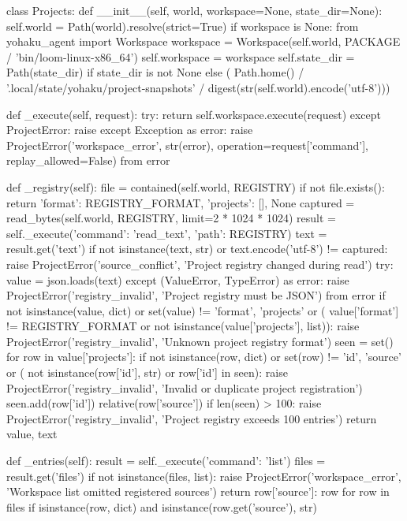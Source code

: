 class Projects:
    def __init__(self, world, workspace=None, state_dir=None):
        self.world = Path(world).resolve(strict=True)
        if workspace is None:
            from yohaku_agent import Workspace
            workspace = Workspace(self.world, PACKAGE / 'bin/loom-linux-x86_64')
        self.workspace = workspace
        self.state_dir = Path(state_dir) if state_dir is not None else (
            Path.home() / '.local/state/yohaku/project-snapshots' /
            digest(str(self.world).encode('utf-8')))

    def _execute(self, request):
        try:
            return self.workspace.execute(request)
        except ProjectError:
            raise
        except Exception as error:
            raise ProjectError('workspace_error', str(error), operation=request['command'],
                               replay_allowed=False) from error

    def _registry(self):
        file = contained(self.world, REGISTRY)
        if not file.exists():
            return {'format': REGISTRY_FORMAT, 'projects': []}, None
        captured = read_bytes(self.world, REGISTRY, limit=2 * 1024 * 1024)
        result = self._execute({'command': 'read_text', 'path': REGISTRY})
        text = result.get('text')
        if not isinstance(text, str) or text.encode('utf-8') != captured:
            raise ProjectError('source_conflict', 'Project registry changed during read')
        try:
            value = json.loads(text)
        except (ValueError, TypeError) as error:
            raise ProjectError('registry_invalid', 'Project registry must be JSON') from error
        if not isinstance(value, dict) or set(value) != {'format', 'projects'} or (
                value['format'] != REGISTRY_FORMAT or not isinstance(value['projects'], list)):
            raise ProjectError('registry_invalid', 'Unknown project registry format')
        seen = set()
        for row in value['projects']:
            if not isinstance(row, dict) or set(row) != {'id', 'source'} or (
                    not isinstance(row['id'], str) or row['id'] in seen):
                raise ProjectError('registry_invalid', 'Invalid or duplicate project registration')
            seen.add(row['id'])
            relative(row['source'])
        if len(seen) > 100:
            raise ProjectError('registry_invalid', 'Project registry exceeds 100 entries')
        return value, text

    def _entries(self):
        result = self._execute({'command': 'list'})
        files = result.get('files')
        if not isinstance(files, list):
            raise ProjectError('workspace_error', 'Workspace list omitted registered sources')
        return {row['source']: row for row in files if isinstance(row, dict) and isinstance(row.get('source'), str)}

